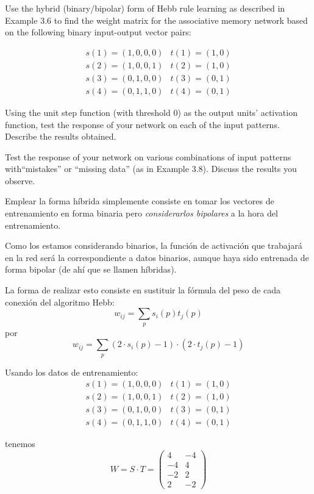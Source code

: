 \begin{problem}[6]
\ppart Use the hybrid (binary/bipolar) form of Hebb rule learning as described in Example
3.6 to find the weight matrix for the associative memory network based on the
following binary input-output vector pairs:

\[\begin{array}{cc}
s(1) = (1,0,0,0) & t(1)=(1,0)\\
s(2) = (1,0,0,1) & t(2) = (1,0)\\
s(3)=(0,1,0,0) & t(3) = (0,1) \\
s(4) = (0,1,1,0) & t(4) = (0,1)
\end{array}\]

\ppart  Using the unit step function (with threshold 0) as the output units' activation function, test the response of your network on each of the input patterns. Describe the results obtained.

\ppart Test the response of your network on various combinations of input patterns with``mistakes'' or ``missing data'' (as in Example 3.8). Discuss the results you observe.

\solution


\spart

Emplear la forma híbrida simplemente consiste en tomar los vectores de entrenamiento en forma binaria pero \emph{considerarlos bipolares} a la hora del entrenamiento.

Como los estamos considerando binarios, la función de activación que trabajará en la red será la correspondiente a datos binarios, aunque haya sido entrenada de forma bipolar (de ahí que se llamen híbridas).

La forma de realizar esto consiste en sustituir la fórmula del peso de cada conexión del algoritmo Hebb:
\[w_{ij} = \sum_p s_i(p)t_j(p)\]
por
\[w_{ij} = \sum_p (2\cdot s_i(p)-1) \cdot (2\cdot t_j(p)-1)\]

Usando los datos de entrenamiento:
\[\begin{array}{cc}
s(1) = (1,0,0,0) & t(1) = (1,0)\\
s(2) = (1,0,0,1) & t(2) = (1,0)\\
s(3)=  (0,1,0,0) & t(3) = (0,1) \\
s(4) = (0,1,1,0) & t(4) = (0,1)
\end{array}\]

tenemos
\[W = S\cdot T = \left( \begin{array}{cc}
4 & -4 \\
-4 & 4 \\
-2 & 2 \\
2 & -2
\end{array}\right)\]


\end{problem}
